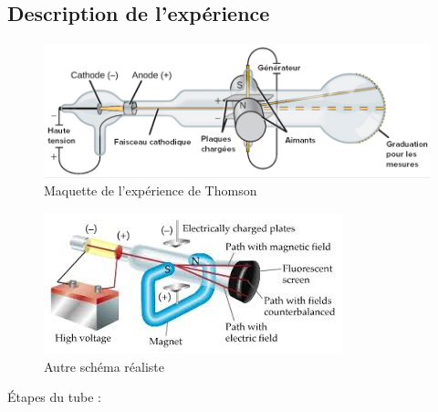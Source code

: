 \documentclass[../main.tex]{subfiles}
\begin{document}
\subsection{Description de l'expérience}
\begin{figure}[h!]
    \centering
    \includegraphics[scale=0.7]{images/02.JJ-Thomson.png}
    \caption{Maquette de l'expérience de Thomson}
    \label{fig:my_label}
\end{figure}
\begin{figure}[h!]
    \centering
    \includegraphics[scale=0.9]{images/08.JJ-Thomson..jpg}
    \caption{Autre schéma réaliste}
    \label{fig:my_label}
\end{figure}
Étapes du tube : \\
\end{document}
